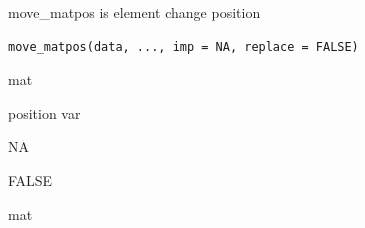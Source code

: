 \documentclass[a4paper]{book}
\begin{document}
%
\begin{Description}
move\_matpos is element change position
\end{Description}
%
\begin{Usage}
\begin{verbatim}
move_matpos(data, ..., imp = NA, replace = FALSE)
\end{verbatim}
\end{Usage}
%
\begin{Arguments}
\begin{ldescription}
\item[\code{data}] mat

\item[\code{...}] position var

\item[\code{imp}] NA

\item[\code{replace}] FALSE
\end{ldescription}
\end{Arguments}
%
\begin{Value}
mat
\end{Value}
%
\end{document}
